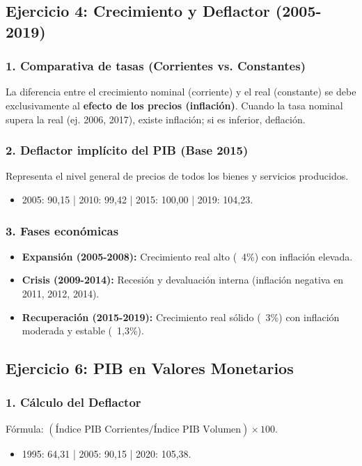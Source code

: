 \subsection{Ejercicio 4: Crecimiento y Deflactor (2005-2019)}

\subsubsection{1. Comparativa de tasas (Corrientes vs. Constantes)}
La diferencia entre el crecimiento nominal (corriente) y el real (constante) se debe exclusivamente al \textbf{efecto de los precios (inflación)}. Cuando la tasa nominal supera la real (ej. 2006, 2017), existe inflación; si es inferior, deflación.

\subsubsection{2. Deflactor implícito del PIB (Base 2015)}
Representa el nivel general de precios de todos los bienes y servicios producidos.
\begin{itemize}
    \item 2005: 90,15 | 2010: 99,42 | 2015: 100,00 | 2019: 104,23.
\end{itemize}

\subsubsection{3. Fases económicas}
\begin{itemize}
    \item \textbf{Expansión (2005-2008):} Crecimiento real alto (~4\%) con inflación elevada.
    \item \textbf{Crisis (2009-2014):} Recesión y devaluación interna (inflación negativa en 2011, 2012, 2014).
    \item \textbf{Recuperación (2015-2019):} Crecimiento real sólido (~3\%) con inflación moderada y estable (~1,3\%).
\end{itemize}

\subsection{Ejercicio 6: PIB en Valores Monetarios}

\subsubsection{1. Cálculo del Deflactor}
Fórmula: $(\text{Índice PIB Corrientes} / \text{Índice PIB Volumen}) \times 100$.
\begin{itemize}
    \item 1995: 64,31 | 2005: 90,15 | 2020: 105,38.
\end{itemize}

